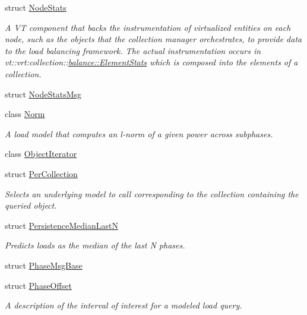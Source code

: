 \begin{DoxyCompactItemize}
struct \hyperlink{structvt_1_1vrt_1_1collection_1_1balance_1_1_node_stats}{Node\+Stats}
\begin{DoxyCompactList}\small\item\em A VT component that backs the instrumentation of virtualized entities on each node, such as the objects that the collection manager orchestrates, to provide data to the load balancing framework. The actual instrumentation occurs in {\ttfamily vt\+::vrt\+:collection\+:}\+:\hyperlink{structvt_1_1vrt_1_1collection_1_1balance_1_1_element_stats}{balance\+::\+Element\+Stats} which is composed into the elements of a collection. \end{DoxyCompactList}\item 
struct \hyperlink{structvt_1_1vrt_1_1collection_1_1balance_1_1_node_stats_msg}{Node\+Stats\+Msg}
\item 
class \hyperlink{classvt_1_1vrt_1_1collection_1_1balance_1_1_norm}{Norm}
\begin{DoxyCompactList}\small\item\em A load model that computes an l-\/norm of a given power across subphases. \end{DoxyCompactList}\item 
class \hyperlink{classvt_1_1vrt_1_1collection_1_1balance_1_1_object_iterator}{Object\+Iterator}
\item 
struct \hyperlink{structvt_1_1vrt_1_1collection_1_1balance_1_1_per_collection}{Per\+Collection}
\begin{DoxyCompactList}\small\item\em Selects an underlying model to call corresponding to the collection containing the queried object. \end{DoxyCompactList}\item 
struct \hyperlink{structvt_1_1vrt_1_1collection_1_1balance_1_1_persistence_median_last_n}{Persistence\+Median\+LastN}
\begin{DoxyCompactList}\small\item\em Predicts loads as the median of the last N phases. \end{DoxyCompactList}\item 
struct \hyperlink{structvt_1_1vrt_1_1collection_1_1balance_1_1_phase_msg_base}{Phase\+Msg\+Base}
\item 
struct \hyperlink{structvt_1_1vrt_1_1collection_1_1balance_1_1_phase_offset}{Phase\+Offset}
\begin{DoxyCompactList}\small\item\em A description of the interval of interest for a modeled load query. \end{DoxyCompactList}\item 

\end{DoxyCompactItemize}
